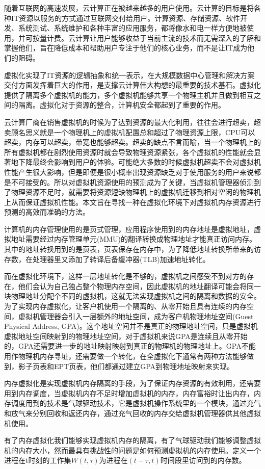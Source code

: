 
随着互联网的高速发展，云计算正在被越来越多的用户使用。云计算的目标是将各种IT资源以服务的方式通过互联网交付给用户。计算资源、存储资源、软件开发、系统测试、系统维护和各种丰富的应用服务，都将像水和电一样方便地被使用，并可按量计费。云计算让用户能够收益于当前主流的技术而无需深入的了解和掌握他们，旨在降低成本和帮助用户专注于他们的核心业务，而不是让IT成为他们的阻碍。

虚拟化实现了IT资源的逻辑抽象和统一表示，在大规模数据中心管理和解决方案交付方面发挥着巨大的作用，是支撑云计算伟大构想的最重要的技术基石。虚拟化提供了隔离多个虚拟机的能力，多个虚拟机能够共享一个物理主机并且做到相互之间的隔离。虚拟化对于资源的整合，计算机安全都起到了重要的作用。

云计算厂商在销售虚拟机的时候为了达到资源的最大化利用，往往会进行超卖，超卖顾名思义就是一个物理机上的虚拟机配置总和超过了物理资源上限，CPU可以超卖，内存可以超卖，带宽也能够超卖。超卖的缺点不言而喻，当一个物理机上的所有虚拟机都在剧烈使用资源时就会导致物理资源紧张，各个虚拟机的性能就会显著地下降最终会影响到用户的体验。可能绝大多数的时候虚拟机超卖不会对虚拟机性能产生很大影响，但是即便是很小概率出现资源缺乏对于使用服务的用户来说都是不可接受的。所以对虚拟机资源使用的预测成为了关键，当虚拟机管理器侦测到了物理资源不足时，就需要将资源短缺物理机上的虚拟机迁移到相对空闲的物理机上从而保证虚拟机性能。本文旨在寻找一种在虚拟化环境下对虚拟机内存资源进行预测的高效而准确的方法。

计算机的内存管理使用的是页式管理，应用程序使用到的内存地址是虚拟地址，虚拟地址需要经过内存管理单元(MMU)的翻译转换成物理地址才能真正访问内存。其中的地址转换用到的是页表，页表保存在内存中，为了降低地址转换所带来的访存数，在处理器里又添加了转译后备缓冲器(TLB)加速地址转化。

而在虚拟化环境下，这样一层地址转化是不够的，虚拟机之间感受不到对方的存在，他们会认为自己独占整个物理内存空间，因此虚拟机的地址翻译可能会将同一块物理地址分配个不同的虚拟机，这就无法实现虚拟机之间的隔离和数据的安全。为了实现内存虚拟化，让客户机使用一个隔离的、从零开始且具有连续的内存空间，虚拟机管理器会引入一层额外的地址空间，成为客户机物理地址空间(Guest Physical Address, GPA)。这个地址空间并不是真正的物理地址空间，只是虚拟机虚拟地址空间映射到的物理地址空间，对于虚拟机来说GPA是连续且从零开始的，GPA还需要进一步的地址映射映射到真正的物理机的物理地址上。GPA不能用作物理机内存寻址，还需要做一个转化，在全虚拟化下通常有两种方法能够做到，影子页表和EPT页表，他们都通过建立GPA到物理地址映射来实现。

内存虚拟化是实现虚拟机内存隔离的手段，为了保证内存资源的有效利用，还需要用到内存调度，当虚拟机内存不足时增加虚拟机的内存，内存富裕时让出内存，内存调度用到的技术是气球驱动技术，它是虚拟机操作系统里的一个模块，通过充气和放气来分别回收和返还内存，通过充气回收的内存交给虚拟机管理器供其他虚拟机使用。

有了内存虚拟化我们能够实现虚拟机内存的隔离，有了气球驱动我们能够调整虚拟机的内存大小，然而最具有挑战性的问题是如何预测虚拟机的内存使用。\cite{wss}定义一个进程在t时刻的工作集$W(t, \tau)$为进程在$(t - \tau, t)$时间段里访问到的内存数。

